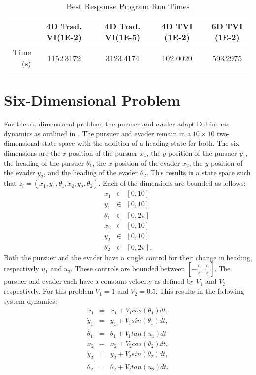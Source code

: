 \begin{table}
\caption{Best Response Program Run Times}
\label{BRPRun}
\begin{center}
\begin{tabular}{||r|c|c|c|c||}\hline
  & 4D Trad. VI(1E-2) & 4D Trad. VI(1E-5) & 4D TVI (1E-2) & 6D TVI (1E-2)\\\hline
Time (s) & 1152.3172 & 3123.4174 & 102.0020 & 593.2975 \\\hline

\end{tabular}
\end{center}
\end{table}  

\section{Six-Dimensional Problem}
For the six dimensional problem, the pursuer and evader adapt Dubins car dynamics as outlined in \cite{dubins}.  The pursuer and evader remain in a $10 \times 10$ two-dimensional  state space with the addition of a heading state for both. The six dimensions are the $x$ position of the pursuer $x_1$, the $y$ position of the pursuer $y_1$, the heading of the pursuer $\theta_1$, the $x$ position of the evader $x_2$, the $y$ position of the evader $y_2$, and the heading of the evader $\theta_2$. This results in a state space such that $z_i = (x_1,y_1,\theta_1,x_2,y_2,\theta_2)$. Each of the dimensions are bounded as follows:
\begin{eqnarray*}
x_1 & \in & [0,10]\\
y_1 & \in & [0,10]\\
\theta_1 & \in & [0,2\pi]\\
x_2 & \in & [0,10]\\
y_2 & \in & [0,10]\\
\theta_2 & \in & [0,2\pi].
\end{eqnarray*} 
Both the pursuer and the evader have a single control for their change in heading, respectively $u_1$ and $u_2$. These controls are bounded between $[-\dfrac{\pi}{4},\dfrac{\pi}{4}]$. The pursuer and evader each have a constant velocity as defined by $V_1$ and $V_2$ respectively. For this problem $V_1 = 1$ and $V_2 = 0.5$. This results in the following system dynamics:
\begin{eqnarray}\label{eqns2}
\dot{x}_1 & = & x_1 +V_1cos(\theta_1)dt,\\
\dot{y}_1 & = & y_1 +V_1sin(\theta_1)dt,\\
\dot{\theta_1}  & = & \theta_1 + V_1tan(u_1)dt\\
\dot{x}_2 & = & x_2 +V_2cos(\theta_2)dt,\\
\dot{y}_2 & = & y_2 +V_2sin(\theta_2)dt,\\
\dot{\theta_2}  & = & \theta_2 + V_2tan(u_2)dt.
\end{eqnarray}
